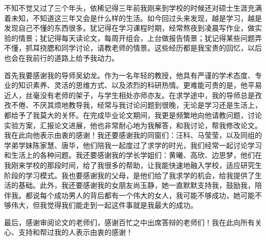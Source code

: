 不知不觉又过了三个年头，依稀记得三年前我刚来到学校的时候还对硕士生涯充满着未知，不知道这三年又会是什么样的生活。如今回过头来发现，越是学习，越是发现自己不懂的东西很多。犹记得在学习课程时期，经常熬夜到凌晨写作业，做实验的情景；犹记得每天读论文，每周开组会，上台做报告情景；犹记得某些问题弄不懂，抓耳挠腮和同学讨论，请教老师的情景。这些经历都是我宝贵的回忆，以后也会在我前行的道路上给予我动力。

首先我要感谢我的导师吴幼龙。作为一名年轻的教授，他具有严谨的学术态度、专业的知识素养、灵活的思维方式、以及浓烈的科研热情。更难能可贵的是，他平易近人，丝毫没有老师的架子，与学生相处亦师亦友。在求学途中，我的导师总是孜孜不倦、不厌其烦地教导我，经常与我讨论问题到很晚，无论是学习还是生活上，都给予了我莫大的关怀。在完成毕业论文期间，我更是频繁地向他请教问题，讨论实验方案，汇报论文进展，他也非常耐心地为我解答，和我讨论，帮我修改论文。我在此向他表示由衷的感谢！我还要感谢我的同窗们：汪科、马莹莹，以及同组的学弟学妹陈家慧、唐华，他们陪我一起度过了求学的时光，我们经常一起讨论学习和生活上的各种问题。我还要感谢我的学长学姐们：黄曦、高欣、边思梦，他们在我刚来学校的那段时间，给了我很多的帮助，让我能快速地融入学校，适应研究生阶段的学习模式。我也要感谢我的父母，是他们给了我求学的机会，给我提供了生活的基础。此外，我还要感谢我的女朋友尚玉静，她一直默默支持我，鼓励我，陪伴我。都说每个成功男人的背后都有一个伟大的女人，我可能不够成功，她可能不够伟大，但我觉得我们能走到一起这件事就是我最大的成功。

最后，感谢审阅论文的老师们，感谢百忙之中出席答辩的老师们！我在此向所有关心、支持和帮过我的人表示由衷的感谢！

\cleardoublepage[plain]%
